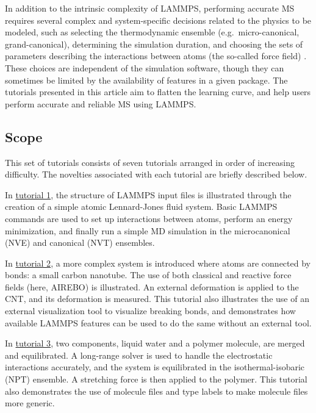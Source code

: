 \documentclass[9pt,tutorial]{livecoms}
\begin{document}
In addition to the intrinsic complexity of LAMMPS, performing accurate
MS requires several complex and system-specific decisions related
to the physics to be modeled, such as selecting the thermodynamic
ensemble (e.g.~micro-canonical, grand-canonical), determining the
simulation duration, and choosing the sets of parameters describing the
interactions between atoms (the so-called force field)
\cite{van2018validation}.  These choices are independent of the
simulation software, though they can sometimes be limited by the availability of
features in a given package.  The tutorials presented in this
article aim to flatten the learning curve, and help users perform
accurate and reliable MS using LAMMPS.

\subsection{Scope}

This set of tutorials consists of seven tutorials arranged in order of
increasing difficulty.  The novelties associated with each tutorial are
briefly described below.

In \hyperref[lennard-jones-label]{tutorial 1}, the structure of LAMMPS
input files is illustrated through the creation of a simple atomic
Lennard-Jones fluid system.  Basic LAMMPS commands are used to set up
interactions between atoms, perform an energy minimization, and finally
run a simple MD simulation in the microcanonical (NVE) and canonical (NVT)
ensembles.

In \hyperref[carbon-nanotube-label]{tutorial 2}, a more complex system
is introduced where atoms are connected by bonds: a small carbon
nanotube. The use of both classical and reactive force fields (here,
AIREBO) is illustrated.  An external deformation is applied to the CNT,
and its deformation is measured.  This tutorial also illustrates the use
of an external visualization tool to visualize breaking bonds, and
demonstrates how available LAMMPS features can be used to do the same
without an external tool.

In \hyperref[all-atoms-label]{tutorial 3}, two components, liquid water
and a polymer molecule, are merged and equilibrated.  A long-range
solver is used to handle the electrostatic interactions accurately, and
the system is equilibrated in the isothermal-isobaric (NPT) ensemble. A
stretching force is then applied to the polymer.  This tutorial also
demonstrates the use of molecule files and type labels
\cite{typelabel_paper} to make molecule files more generic.
\end{document}
